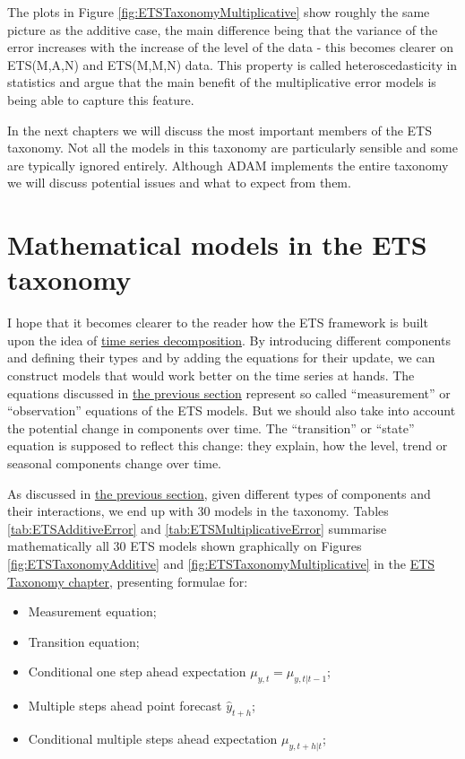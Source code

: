 \documentclass[
]{book}
\providecommand{\tightlist}{%
  \setlength{\itemsep}{0pt}\setlength{\parskip}{0pt}}
\theoremstyle{definition}
\theoremstyle{definition}
\theoremstyle{definition}
\theoremstyle{definition}
\theoremstyle{remark}
\begin{document}
The plots in Figure \ref{fig:ETSTaxonomyMultiplicative} show roughly the same picture as the additive case, the main difference being that the variance of the error increases with the increase of the level of the data - this becomes clearer on ETS(M,A,N) and ETS(M,M,N) data. This property is called heteroscedasticity in statistics and \citep{Hyndman2008b} argue that the main benefit of the multiplicative error models is being able to capture this feature.

In the next chapters we will discuss the most important members of the ETS taxonomy. Not all the models in this taxonomy are particularly sensible and some are typically ignored entirely. Although ADAM implements the entire taxonomy we will discuss potential issues and what to expect from them.

\hypertarget{ETSTaxonomyMaths}{%
\section{Mathematical models in the ETS taxonomy}\label{ETSTaxonomyMaths}}

I hope that it becomes clearer to the reader how the ETS framework is built upon the idea of \protect\hyperlink{tsComponents}{time series decomposition}. By introducing different components and defining their types and by adding the equations for their update, we can construct models that would work better on the time series at hands. The equations discussed in \protect\hyperlink{tsComponents}{the previous section} represent so called ``measurement'' or ``observation'' equations of the ETS models. But we should also take into account the potential change in components over time. The ``transition'' or ``state'' equation is supposed to reflect this change: they explain, how the level, trend or seasonal components change over time.

As discussed in \protect\hyperlink{ETSTaxonomy}{the previous section}, given different types of components and their interactions, we end up with 30 models in the taxonomy. Tables \ref{tab:ETSAdditiveError} and \ref{tab:ETSMultiplicativeError} summarise mathematically all 30 ETS models shown graphically on Figures \ref{fig:ETSTaxonomyAdditive} and \ref{fig:ETSTaxonomyMultiplicative} in the \protect\hyperlink{ETSTaxonomy}{ETS Taxonomy chapter}, presenting formulae for:

\begin{itemize}
\tightlist
\item
  Measurement equation;
\item
  Transition equation;
\item
  Conditional one step ahead expectation \(\mu_{y,t} = \mu_{y,t|t-1}\);
\item
  Multiple steps ahead point forecast \(\hat{y}_{t+h}\);
\item
  Conditional multiple steps ahead expectation \(\mu_{y,t+h|t}\);
\end{itemize}
\end{document}
